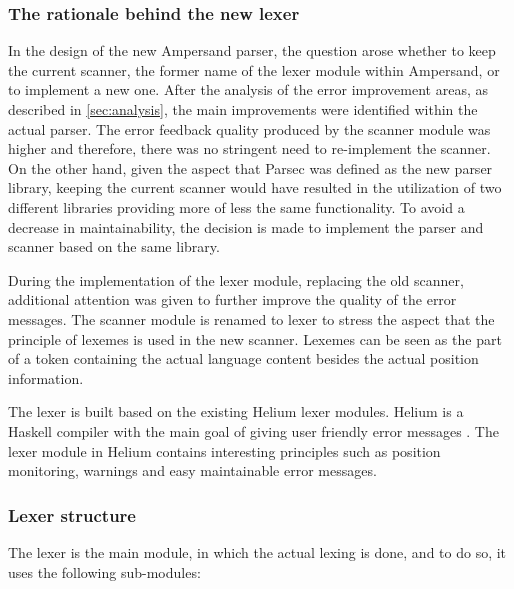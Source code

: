 \subsubsection{The rationale behind the new lexer}
In the design of the new Ampersand parser, the question arose whether to keep the current scanner, the former name of the lexer module within Ampersand, or to implement a new one.
After the analysis of the error improvement areas, as described in \autoref{sec:analysis}, the main improvements were identified within the actual parser.
The error feedback quality produced by the scanner module was higher and therefore, there was no stringent need to re-implement the scanner.
On the other hand, given the aspect that Parsec was defined as the new parser library, keeping the current scanner would have resulted in the utilization of two different libraries providing more of less the same functionality.
To avoid a decrease in maintainability, the decision is made to implement the parser and scanner based on the same library.

During the implementation of the lexer module, replacing the old scanner, additional attention was given to further improve the quality of the error messages.
The scanner module is renamed to lexer to stress the aspect that the principle of lexemes is used in the new scanner.
Lexemes can be seen as the part of a token containing the actual language content besides the actual position information.

The lexer is built based on the existing Helium lexer modules. 
Helium is a Haskell compiler with the main goal of giving user friendly error messages .
The lexer module in Helium contains interesting principles such as position monitoring, warnings and easy maintainable error messages.

\subsubsection{Lexer structure}
The lexer is the main module, in which the actual lexing is done, and to do so, it uses the following sub-modules:

